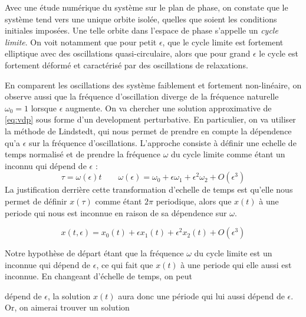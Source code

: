 Avec une étude numérique du système sur le plan de phase, on constate que le système tend vers une unique orbite isolée, quelles que soient les conditions initiales imposées. 
Une telle orbite dans l'espace de phase s'appelle un \emph{cycle limite}. On voit notamment que pour petit $\epsilon$, que le cycle limite est fortement elliptique avec des oscillations quasi-circulaire, 
alors que pour grand $\epsilon$ le cycle est fortement déformé et caractérisé par des oscillations de relaxations.

En comparent les oscillations des système faiblement et fortement non-linéaire, on observe aussi que la fréquence d'oscillation diverge de la fréquence naturelle $\omega_0 = 1$ lorsque $\epsilon$ augmente. 
On va chercher une solution approximative de \eqref{eq:vdp} sous forme d'un development perturbative. En particulier, on va utiliser la méthode de Lindstedt, 
qui nous permet de prendre en compte la dépendence qu'a $\epsilon$ sur la fréquence d'oscillations. L'approche consiste à définir une echelle de temps normalisé et de prendre la fréquence $\omega$ du cycle limite comme étant un inconnu qui dépend de $\epsilon$ :
\begin{equation}
    \tau = \omega(\epsilon)t
    \qquad
    \omega(\epsilon) = \omega_0 + \epsilon\omega_1 + \epsilon^2\omega_2 + O(\epsilon^3)
\end{equation}
La justification derrière cette transformation d'echelle de temps est qu'elle nous permet de définir $x(\tau)$ comme étant $2\pi$ periodique, 
alors que $x(t)$ à une periode qui nous est inconnue en raison de sa dépendence sur $\omega$.

\begin{equation}
    x(t, \epsilon) = x_0(t) + \epsilon x_1(t) + \epsilon^2 x_2(t) + O(\epsilon^3)
\end{equation}


Notre hypothèse de départ étant que la fréquence $\omega$ du cycle limite est un inconnue qui dépend de $\epsilon$, 
ce qui fait que $x(t)$ à une periode qui elle aussi est inconnue. 
En changeant d'échelle de temps, on peut 

dépend de $\epsilon$, la solution $x(t)$ aura donc une période qui lui aussi dépend de $\epsilon$. Or, on aimerai trouver un solution


